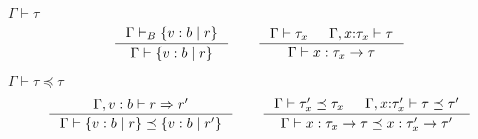 \documentclass[10pt,a4paper]{article}
\newcommand\iswellformed[2]{\ensuremath{#1 \vdash #2}}
\newcommand\biswellformed[2]{\ensuremath{#1 \vdash_B #2}}
\newcommand\issubtype[3]{\ensuremath{#1 \vdash #2 \preceq #3}}
\newcommand\issubref[3]{\ensuremath{#1 \vdash #2 \Rightarrow #3}}
\begin{document}
\hfill\mbox{\iswellformed{\Gamma}{\tau}}
$$
\inference{
	\biswellformed{\Gamma}{\left\lbrace v : b \mid r \right\rbrace}
}{
	\iswellformed{\Gamma}{\left\lbrace v : b \mid r \right\rbrace}
}
\qquad
\inference{
	\iswellformed{\Gamma}{\tau_x} &&
	\iswellformed{\Gamma, x \colon \tau_x}{\tau}
}{
	\iswellformed{\Gamma}{x:\tau_x \rightarrow \tau}
}
$$

\hfill\mbox{\issubtype{\Gamma}{\tau}{\tau}}
$$
\inference{
	\issubref{\Gamma, v:b}{r}{r'}
}{
	\issubtype{\Gamma}{\left\lbrace v : b \mid r \right\rbrace}{\left\lbrace v : b \mid r' \right\rbrace}
}
\qquad
\inference{
	\issubtype{\Gamma}{\tau'_x}{\tau_x} &&
	\issubtype{\Gamma, x \colon \tau'_x}{\tau}{\tau'}
}{
	\issubtype{\Gamma}{x:\tau_x \rightarrow \tau}{x:\tau'_x \rightarrow \tau'}
}
$$
\end{document}
